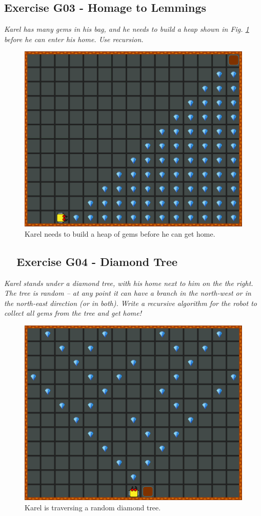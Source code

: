 {{{{\subsection{Exercise G03 - Homage to Lemmings}

{\em  Karel has many gems in his bag, and he needs to build a heap shown in Fig. \ref{fig:g03} before he can 
enter his home. Use recursion.}\\[-7mm]

\begin{figure}[!ht]
\begin{center}
\includegraphics[height=0.4\textwidth]{imgk/g03.png}
\end{center}
\vspace{-4mm}
\caption{Karel needs to build a heap of gems before he can get home.}
\label{fig:g03}
\vspace{-1cm}
\end{figure}
\newpage
\noindent

\subsection{\ \ Exercise G04 - Diamond Tree}

{\em Karel stands under a diamond tree, with his home next to him on the the right. 
The tree is random -- at any point it can have 
a branch in the north-west or in the north-east direction (or in both). Write a recursive 
algorithm for the robot to collect all gems from the tree and get home!  }

\begin{figure}[!ht]
\begin{center}
\includegraphics[height=0.4\textwidth]{imgk/g04.png}
\end{center}
\vspace{-4mm}
\caption{Karel is traversing a random diamond tree.}
\label{fig:g04}
\vspace{-4mm}
\end{figure}
\noindent

}}}}
